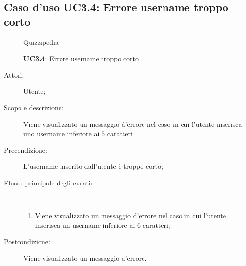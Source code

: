 \subsection{Caso d'uso UC3.4: Errore username troppo corto}
	\begin{figure}[H]
		\centering
		\begin{resizedtikzpicture}{\textwidth}
		\begin{umlsystem}[x=0, fill=lightgray!20]{Quizzipedia}
		\end{umlsystem}
		\end{resizedtikzpicture}
		\caption{\textbf{UC3.4}: Errore username troppo corto}
		\label{UC3.4}
	\end{figure}
\begin{description}
\item[Attori:] Utente;
\item[Scopo e descrizione:] Viene visualizzato un messaggio d'errore nel caso in cui l'utente inserisca uno username inferiore ai 6 caratteri
      \item[Precondizione:] L'username inserito dall'utente è troppo corto;

        \item[Flusso principale degli eventi:] \ 
 \begin{enumerate}
          \item Viene visualizzato un messaggio d'errore nel caso in cui l'utente inserisca un username inferiore ai 6 caratteri;

      \end{enumerate}
    \item[Postcondizione:] Viene visualizzato un messaggio d'errore.
  \end{description}
\hypertarget{UC3.5}{}
